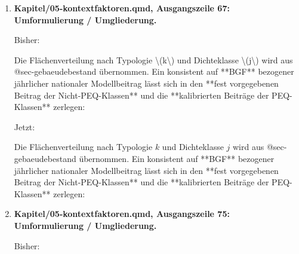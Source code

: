 \documentclass[
  ngerman,
  a4paper,
  DIV=11]{scrreprt}
\newenvironment{Shaded}{\begin{snugshade}}{\end{snugshade}}
\newcommand{\NormalTok}[1]{\textcolor[rgb]{0.00,0.23,0.31}{#1}}
\begin{document}
\begin{enumerate}
  Jetzt:

\begin{Shaded}
\begin{Highlighting}[]
\NormalTok{Für die Sanierungsanpassung gilt ausdrücklich: **kein einheitlicher Faktor für sämtliche sanierten Flächen**. Der Wert $c\_\{\textbackslash{}mathrm\{S\},k\}$ hängt von der zugewiesenen Typologie ab und wird mit deren energetischen Annahmen und nationalem Flächenanteil gemeinsam kalibriert. Ob für bestimmte Klassen der Anpassungswert null ist und wie unterschiedliche Sanierungsintensitäten bewertet werden, ist anhand der neuen Excel{-}Klassen fachlich zu begründen.}
\end{Highlighting}
\end{Shaded}
\item
  \textbf{Kapitel/05-kontextfaktoren.qmd, Ausgangszeile 67:
  Umformulierung / Umgliederung.}

  Bisher:

\begin{Shaded}
\begin{Highlighting}[]
\NormalTok{Die Flächenverteilung nach Typologie \textbackslash{}(k\textbackslash{}) und Dichteklasse \textbackslash{}(j\textbackslash{}) wird aus @sec{-}gebaeudebestand übernommen. Ein konsistent auf **BGF** bezogener jährlicher nationaler Modellbeitrag lässt sich in den **fest vorgegebenen Beitrag der Nicht{-}PEQ{-}Klassen** und die **kalibrierten Beiträge der PEQ{-}Klassen** zerlegen:}
\end{Highlighting}
\end{Shaded}

  Jetzt:

\begin{Shaded}
\begin{Highlighting}[]
\NormalTok{Die Flächenverteilung nach Typologie $k$ und Dichteklasse $j$ wird aus @sec{-}gebaeudebestand übernommen. Ein konsistent auf **BGF** bezogener jährlicher nationaler Modellbeitrag lässt sich in den **fest vorgegebenen Beitrag der Nicht{-}PEQ{-}Klassen** und die **kalibrierten Beiträge der PEQ{-}Klassen** zerlegen:}
\end{Highlighting}
\end{Shaded}
\item
  \textbf{Kapitel/05-kontextfaktoren.qmd, Ausgangszeile 75:
  Umformulierung / Umgliederung.}

  Bisher:


\end{enumerate}
\end{document}
